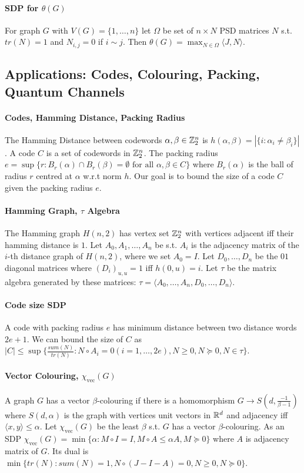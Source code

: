 \documentclass[letterpaper,11pt,oneside,onecolumn]{article}
\begin{document}
\paragraph{SDP for $\theta(G)$} For graph $G$ with $V(G) = \{1,\dots,n\}$ let $\Omega$ be set of $n\times N$ PSD matrices $N$ s.t. $tr(N) = 1$ and $N_{i,j} = 0$ if $i\sim j$. Then $\theta(G) = \max_{N \in \Omega} \langle J, N\rangle$.
\subsection*{Applications: Codes, Colouring, Packing, Quantum Channels}
\paragraph{Codes, Hamming Distance, Packing Radius} The Hamming Distance between codewords $\alpha,\beta \in \mathbb{Z}^n_2$ is $h(\alpha,\beta) = |\{i:\alpha_i \neq \beta_i \}|$. A code $C$ is a set of codewords in $\mathbb{Z}^n_2$. The packing radius $e = \sup \{ r: B_r(\alpha) \cap B_r(\beta) = \emptyset \text{ for all } \alpha,\beta \in C\}$ where $B_r(\alpha)$ is the ball of radius $r$ centred at $\alpha$ w.r.t norm $h$. Our goal is to bound the size of a code $C$ given the packing radius $e$.
\paragraph{Hamming Graph, $\tau$ Algebra} The Hamming graph $H(n,2)$ has vertex set $\mathbb{Z}^n_2$ with vertices adjacent iff their hamming distance is $1$. Let $A_0, A_1, \dots, A_n$ be s.t. $A_i$ is the adjacency matrix of the $i$-th distance graph of $H(n,2)$, where we set $A_0 = I$. Let $D_0,\dots, D_n$ be the $0$$1$ diagonal matrices where $(D_i)_{u,u}= 1$ iff $h(0,u) = i$. Let $\tau$ be the matrix algebra generated by these matrices: $\tau = \langle A_0, \dots, A_n, D_0, \dots, D_n \rangle$.
\paragraph{Code size SDP} A code with packing radius $e$ has minimum distance between two distance words $2e+1$. We can bound the size of $C$ as $|C| \leq \sup \{ \frac{sum(N)}{tr(N)} : N \circ A_i = 0 (i = 1, \dots, 2e), N \geq 0, N \succcurlyeq 0, N \in \tau \}$.
\paragraph{Vector Colouring, $\chi_{\text{vec}}(G)$} A graph $G$ has a vector $\beta$-colouring if there is a homomorphism $G \rightarrow S(d, \frac{-1}{\beta -1})$ where $S(d,\alpha)$ is the graph with vertices unit vectors in $\mathbb{R}^d$ and adjacency iff $\langle x, y\rangle \leq \alpha$. Let $\chi_{\text{vec}}(G)$ be the least $\beta$ s.t. $G$ has a vector $\beta$-colouring. As an SDP $\chi_{\text{vec}}(G) = \min\{\alpha: M\circ I = I, M\circ A\leq \alpha A, M \succcurlyeq 0\}$ where $A$ is adjacency matrix of $G$. Its dual is $\min\{tr(N) : sum(N) = 1, N\circ(J-I-A) = 0, N \geq 0, N \succcurlyeq 0\}$.
\end{document}
